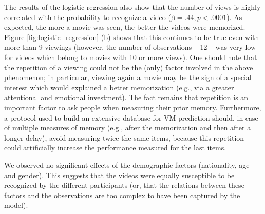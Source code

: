 \documentclass[sigconf]{acmart}
\begin{document}
The results of the logistic regression also show that the number of views is highly correlated with the probability to recognize a video ($\beta=.44, p<.0001$).
As expected, the more a movie was seen, the better the videos were memorized.
Figure \ref{fig:logistic_regression} (b) shows that this continues to be true even with more than 9 viewings (however, the number of observations -- 12 -- was very low for videos which belong to movies with 10 or more views).
One should note that the repetition of a viewing could not be the (only) factor involved in the above phenomenon; in particular, viewing again a movie may be the sign of a special interest which would explained a better memorization (e.g., via a greater attentional and emotional investment).
The fact remains that repetition is an important factor to ask people when measuring their prior memory.
Furthermore, a protocol used to build an extensive database for VM prediction should, in case of multiple measures of memory (e.g., after the memorization and then after a longer delay), avoid measuring twice the same items, because this repetition could artificially increase the performance measured for the last items.

We observed no significant effects of the demographic factors (nationality, age and gender).
This suggests that the videos were equally susceptible to be recognized by the different participants (or, that the relations between these factors and the observations are too complex to have been captured by the model).



\end{document}
